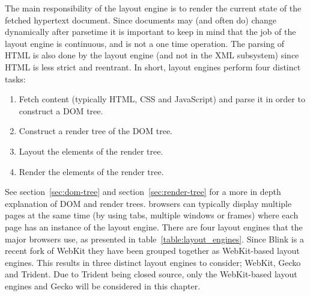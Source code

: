 \documentclass[a4paper,11pt]{kth-mag}
\begin{document}
      The main responsibility of the \gls{layout engine} is to render the current state of the fetched \gls{hypertext} \gls{document}.
      Since \glspl{document} may (and often do) change dynamically after parsetime it is important to keep in mind that the job of the \gls{layout engine} is continuous, and is not a one time operation.
      The parsing of \gls{HTML} is also done by the \gls{layout engine} (and not in the \gls{XML} subsystem) since \gls{HTML} is less strict and reentrant.
      In short, \glspl{layout engine} perform four distinct tasks:
      \begin{enumerate}
        \item Fetch content (typically \gls{HTML}, \gls{CSS} and \gls{JavaScript}) and parse it in order to construct a \gls{DOM} tree. 
        \item Construct a \gls{render tree} of the \gls{DOM} tree.
        \item Layout the \glspl{element} of the \gls{render tree}.
        \item Render the \glspl{element} of the \gls{render tree}.
      \end{enumerate}
      See section~\ref{sec:dom-tree} and section~\ref{sec:render-tree} for a more in depth explanation of \gls{DOM} and \glspl{render tree}.
      \Glspl{browser} can typically display multiple pages at the same time (by using tabs, multiple windows or frames) where each page has an instance of the \gls{layout engine}.
      There are four \glspl{layout engine} that the major \glspl{browser} use, as presented in table~\ref{table:layout_engines}.
      Since Blink is a recent \gls{fork} of \gls{WebKit} they have been grouped together as \gls{WebKit}-based \glspl{layout engine}.
      This results in three distinct \glspl{layout engine} to consider; \gls{WebKit}, Gecko and Trident.
      Due to Trident being closed source, only the \gls{WebKit}-based \glspl{layout engine} and Gecko will be considered in this chapter. 
\end{document}
